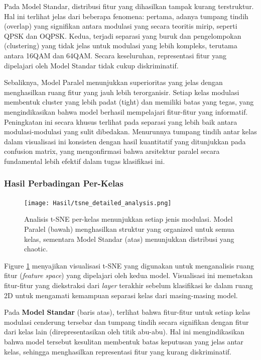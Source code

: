 \documentclass{article}
\begin{document}
Pada Model Standar, distribusi fitur yang dihasilkan tampak kurang terstruktur. Hal ini terlihat jelas dari beberapa fenomena: 
pertama, adanya tumpang tindih (overlap) yang signifikan antara modulasi yang secara teoritis mirip, seperti QPSK dan OQPSK. 
Kedua, terjadi separasi yang buruk dan pengelompokan (clustering) yang tidak jelas untuk modulasi yang lebih kompleks, 
terutama antara 16QAM dan 64QAM. Secara keseluruhan, representasi fitur yang dipelajari oleh Model Standar tidak cukup 
diskriminatif.

Sebaliknya, Model Paralel menunjukkan superioritas yang jelas dengan menghasilkan ruang fitur yang jauh lebih terorganisir. 
Setiap kelas modulasi membentuk cluster yang lebih padat (tight) dan memiliki batas yang tegas, yang mengindikasikan bahwa model 
berhasil mempelajari fitur-fitur yang informatif. Peningkatan ini secara khusus terlihat pada separasi yang lebih baik antara 
modulasi-modulasi yang sulit dibedakan. Menurunnya tumpang tindih antar kelas dalam visualisasi ini konsisten dengan hasil kuantitatif 
yang ditunjukkan pada confusion matrix, yang mengonfirmasi bahwa arsitektur paralel secara fundamental lebih efektif dalam tugas klasifikasi ini.
\newpage 

\subsubsection{\textbf{Hasil Perbadingan Per-Kelas}}
\begin{figure}[H]
\centerline{\texttt{[image: Hasil/tsne\_detailed\_analysis.png]}}
\caption{Analisis t-SNE per-kelas menunjukkan setiap jenis modulasi. Model Paralel (bawah) menghasilkan struktur yang organized untuk semua kelas, sementara Model Standar (atas) menunjukkan distribusi yang chaotic.}
\label{fig:tsne_per_class}
\end{figure}
Figure \ref{fig:tsne_per_class} menyajikan visualisasi t-SNE yang digunakan untuk menganalisis ruang fitur (\textit{feature space}) yang dipelajari oleh kedua model. 
Visualisasi ini memetakan fitur-fitur yang diekstraksi dari \textit{layer} terakhir sebelum klasifikasi ke dalam ruang 2D untuk mengamati kemampuan separasi kelas dari masing-masing model.

Pada \textbf{Model Standar} (baris atas), terlihat bahwa fitur-fitur untuk setiap kelas modulasi cenderung tersebar dan tumpang tindih secara signifikan dengan fitur dari kelas lain (direpresentasikan oleh titik abu-abu). 
Hal ini mengindikasikan bahwa model tersebut kesulitan membentuk batas keputusan yang jelas antar kelas, sehingga menghasilkan representasi fitur yang kurang diskriminatif.
\end{document}
